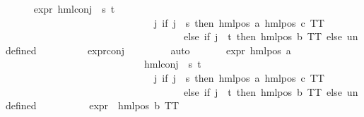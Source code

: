 \begin{isabellebody}
\ \ \ \ \isamarkupfalse%
\ {\isachardoublequoteopen}expr{\isacharunderscore}{\kern0pt}{}\ {\isacharparenleft}{\kern0pt}hml{\isacharunderscore}{\kern0pt}conj\ {\isacharbraceleft}{\kern0pt}{\isacharbraceright}{\kern0pt}\ {\isacharbraceleft}{\kern0pt}s{\isacharcomma}{\kern0pt}\ t{\isacharbraceright}{\kern0pt}\isanewline
\ \ \ \ \ \ \ \ \ \ \ \ \ \ \ \ \ \ \ \ \ \ \ \ \ \ \ \ \ \ {\isacharparenleft}{\kern0pt}{\isasymlambda}j{\isachardot}{\kern0pt}\ if\ j\ {\isacharequal}{\kern0pt}\ s\ then\ hml{\isacharunderscore}{\kern0pt}pos\ a\ {\isacharparenleft}{\kern0pt}hml{\isacharunderscore}{\kern0pt}pos\ c\ TT{\isacharparenright}{\kern0pt}\isanewline
\ \ \ \ \ \ \ \ \ \ \ \ \ \ \ \ \ \ \ \ \ \ \ \ \ \ \ \ \ \ \ \ \ \ \ \ else\ if\ j\ {\isacharequal}{\kern0pt}\ t\ then\ hml{\isacharunderscore}{\kern0pt}pos\ b\ TT\ else\ undefined{\isacharparenright}{\kern0pt}{\isacharparenright}{\kern0pt}\ {\isacharequal}{\kern0pt}\ {}{\isachardoublequoteclose}\isanewline
\ \ \ \ \ \ \isamarkupfalse%
\ expr{\isacharunderscore}{\kern0pt}{}{\isacharunderscore}{\kern0pt}conj\ \isanewline
\ \ \ \ \ \ \isamarkupfalse%
\ auto\isanewline
\ \ \ \ \isamarkupfalse%
\ {}{\isacharcolon}{\kern0pt}\ {\isachardoublequoteopen}expr{\isacharunderscore}{\kern0pt}{}\ {\isacharparenleft}{\kern0pt}hml{\isacharunderscore}{\kern0pt}pos\ a\isanewline
\ \ \ \ \ \ \ \ \ \ \ \ \ \ \ \ \ \ \ \ \ \ \ \ \ \ \ \ {\isacharparenleft}{\kern0pt}hml{\isacharunderscore}{\kern0pt}conj\ {\isacharbraceleft}{\kern0pt}{\isacharbraceright}{\kern0pt}\ {\isacharbraceleft}{\kern0pt}s{\isacharcomma}{\kern0pt}\ t{\isacharbraceright}{\kern0pt}\isanewline
\ \ \ \ \ \ \ \ \ \ \ \ \ \ \ \ \ \ \ \ \ \ \ \ \ \ \ \ \ \ {\isacharparenleft}{\kern0pt}{\isasymlambda}j{\isachardot}{\kern0pt}\ if\ j\ {\isacharequal}{\kern0pt}\ s\ then\ hml{\isacharunderscore}{\kern0pt}pos\ a\ {\isacharparenleft}{\kern0pt}hml{\isacharunderscore}{\kern0pt}pos\ c\ TT{\isacharparenright}{\kern0pt}\isanewline
\ \ \ \ \ \ \ \ \ \ \ \ \ \ \ \ \ \ \ \ \ \ \ \ \ \ \ \ \ \ \ \ \ \ \ \ else\ if\ j\ {\isacharequal}{\kern0pt}\ t\ then\ hml{\isacharunderscore}{\kern0pt}pos\ b\ TT\ else\ undefined{\isacharparenright}{\kern0pt}{\isacharparenright}{\kern0pt}{\isacharparenright}{\kern0pt}\ {\isacharequal}{\kern0pt}\ {}{\isachardoublequoteclose}\isanewline
\ \ \ \ \ \ \ {}{\isacharcolon}{\kern0pt}\ {\isachardoublequoteopen}expr{\isacharunderscore}{\kern0pt}{}\ {\isacharparenleft}{\kern0pt}\ hml{\isacharunderscore}{\kern0pt}pos\ b\ TT{\isacharparenright}{\kern0pt}\ {\isacharequal}{\kern0pt}\ {}{\isachardoublequoteclose}\isanewline

\end{isabellebody}
